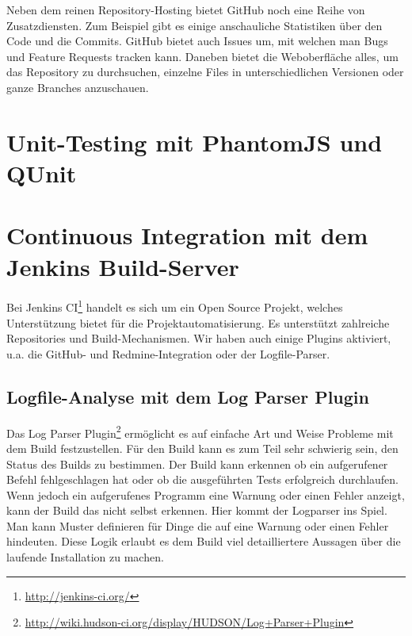 Neben dem reinen Repository-Hosting bietet GitHub noch eine Reihe von Zusatzdiensten. Zum Beispiel gibt es einige anschauliche Statistiken über den Code und die Commits. GitHub bietet auch Issues um, mit welchen man Bugs und Feature Requests tracken kann. Daneben bietet die Weboberfläche alles, um das Repository zu durchsuchen, einzelne Files in unterschiedlichen Versionen oder ganze Branches anzuschauen. 

\section{Unit-Testing mit PhantomJS und QUnit}

\section{Continuous Integration mit dem Jenkins Build-Server}
Bei Jenkins CI\footnote{\url{http://jenkins-ci.org/}} handelt es sich um ein Open Source Projekt, welches Unterstützung bietet für die Projektautomatisierung. Es unterstützt zahlreiche Repositories und Build-Mechanismen. Wir haben auch einige Plugins aktiviert, u.a. die GitHub- und Redmine-Integration oder der Logfile-Parser.

\subsection{Logfile-Analyse mit dem Log Parser Plugin}
Das Log Parser Plugin\footnote{\url{http://wiki.hudson-ci.org/display/HUDSON/Log+Parser+Plugin}} ermöglicht es auf einfache Art und Weise Probleme mit dem Build festzustellen. Für den Build kann es zum Teil sehr schwierig sein, den Status des Builds zu bestimmen. Der Build kann erkennen ob ein aufgerufener Befehl fehlgeschlagen hat oder ob die ausgeführten Tests erfolgreich durchlaufen. Wenn jedoch ein aufgerufenes Programm eine Warnung oder einen Fehler anzeigt, kann der Build das nicht selbst erkennen. Hier kommt der Logparser ins Spiel. Man kann Muster definieren für Dinge die auf eine Warnung oder einen Fehler hindeuten. Diese Logik erlaubt es dem Build viel detailliertere Aussagen über die laufende Installation zu machen.

